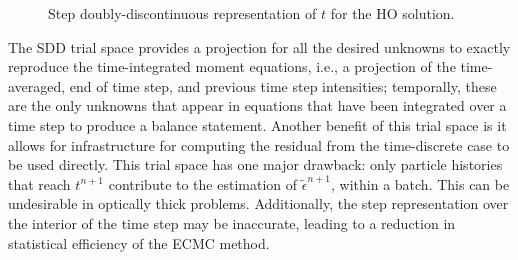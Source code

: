 \begin{figure}[H]
    \centering
    \begin{center}
    \end{center}
    \caption{Step doubly-discontinuous representation of $t$ for the HO solution.}
    \label{fig:dd_time}
\end{figure}

The SDD trial space provides a projection for all the desired unknowns to exactly
reproduce the time-integrated moment
equations, i.e., a projection of the time-averaged, end of time step, and previous time step intensities;
temporally, these are the only unknowns that appear in equations that have
been integrated over a time step to produce a balance statement.  Another benefit of this
trial space is it allows for infrastructure for computing the residual from the
time-discrete case to be used directly.  This trial space has one major drawback:
only particle histories that reach $t^{n+1}$ contribute to the estimation of $\tilde
\epsilon^{n+1}$, within a batch.  This can be undesirable in optically thick problems.
Additionally, the step representation over the interior of the time step may be
inaccurate, leading to a reduction in statistical efficiency of the ECMC method.



